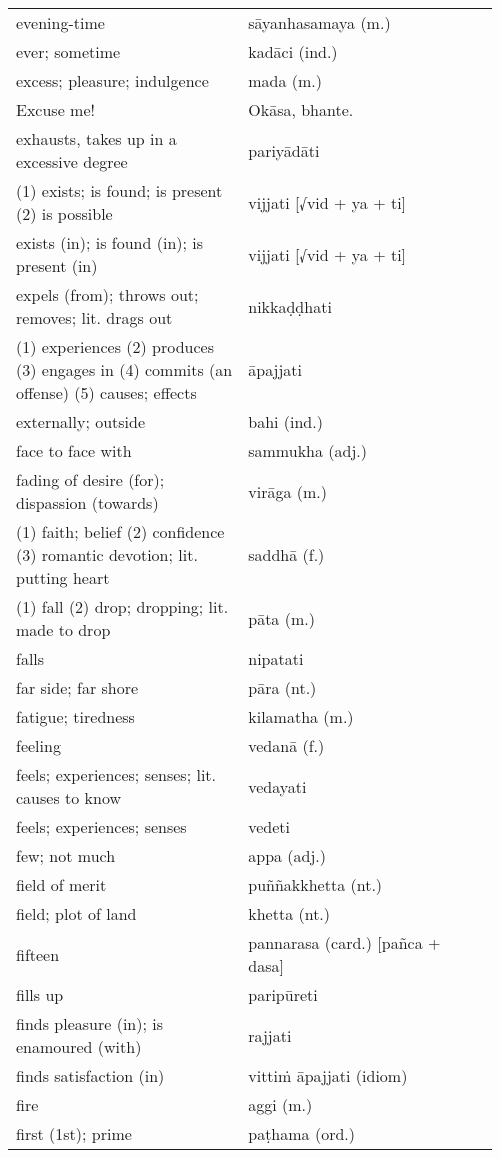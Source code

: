 \documentclass[a5paper]{memoir}
\begin{document}
\begin{longtable}{L{0.48\linewidth} L{0.48\linewidth} H}
evening-time & sāyanhasamaya (m.) & \\
ever; sometime & kadāci (ind.) & \\
excess; pleasure; indulgence & mada (m.) & \\
Excuse me! & Okāsa, bhante. & \\
exhausts, takes up in a excessive degree & pariyādāti & \\
(1) exists; is found; is present (2) is possible & vijjati [√vid + ya + ti] & \\
exists (in); is found (in); is present (in) & vijjati [√vid + ya + ti] & \\
expels (from); throws out; removes; lit. drags out & nikkaḍḍhati & \\
(1) experiences (2) produces (3) engages in (4) commits (an offense) (5) causes; effects & āpajjati & \\
externally; outside & bahi (ind.) & \\
face to face with & sammukha (adj.) & \\
fading of desire (for); dispassion (towards) & virāga (m.) & \\
(1) faith; belief (2) confidence (3) romantic devotion; lit. putting heart & saddhā (f.) & \\
(1) fall (2) drop; dropping; lit. made to drop & pāta (m.) & \\
falls & nipatati & \\
far side; far shore & pāra (nt.) & \\
fatigue; tiredness & kilamatha (m.) & \\
feeling & vedanā (f.) & \\
feels; experiences; senses; lit. causes to know & vedayati & \\
feels; experiences; senses & vedeti & \\
few; not much & appa (adj.) & \\
field of merit & puññakkhetta (nt.) & \\
field; plot of land & khetta (nt.) & \\
fifteen & pannarasa (card.) [pañca + dasa] & \\
fills up & paripūreti & \\
finds pleasure (in); is enamoured (with) & rajjati & \\
finds satisfaction (in) & vittiṁ āpajjati (idiom) & \\
fire & aggi (m.) & \\
first (1st); prime & paṭhama (ord.) & \\

\end{longtable}
\end{document}
